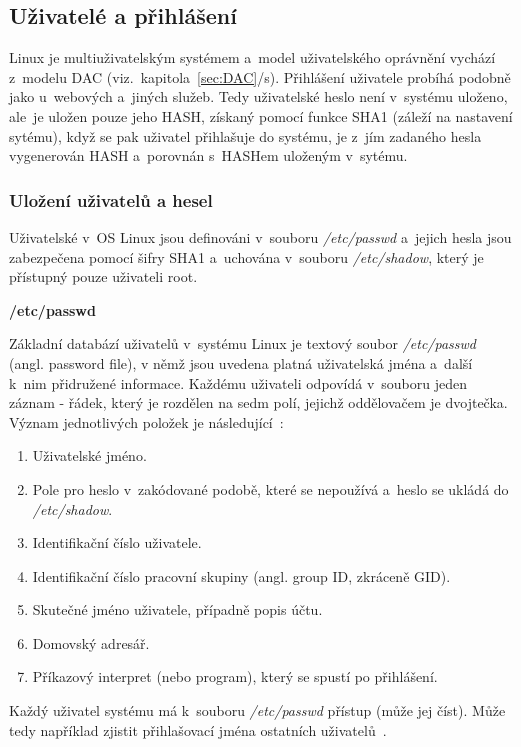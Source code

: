 \documentclass[a4paper,12pt]{article}
\newcommand{\odkazNaKapitolu}[1]{(viz.~kapitola~\ref{#1}/s\pageref{#1})}
\newcommand{\nadpis}[1]{%
	\vspace{4 mm}
	\textbf{#1}\\
	\vspace{4 mm}
	}
\begin{document}
\subsection{Uživatelé a přihlášení}

Linux je multiuživatelským systémem a~model uživatelského oprávnění vychází z~modelu DAC \odkazNaKapitolu{sec:DAC}. Přihlášení uživatele probíhá podobně jako u~webových a~jiných služeb. Tedy uživatelské heslo není v~systému uloženo, ale~je uložen pouze jeho HASH, získaný pomocí funkce SHA1 (záleží na nastavení sytému), když se pak uživatel přihlašuje do systému, je z~jím zadaného hesla vygenerován HASH a~porovnán s~HASHem uloženým v~sytému. 

\subsubsection{Uložení uživatelů a hesel}
Uživatelské v~OS Linux jsou definováni v~souboru \textit{/etc/passwd} a~jejich hesla jsou zabezpečena pomocí šifry SHA1 a~uchována v~souboru \textit{/etc/shadow}, který je přístupný pouze uživateli root. 

\nadpis{/etc/passwd}

Základní databází uživatelů v~systému Linux je textový soubor \textit{/etc/passwd} (angl. password file), v němž jsou uvedena platná uživatelská jména a~další k~nim přidružené informace. Každému uživateli odpovídá v~souboru jeden záznam - řádek, který je rozdělen na sedm polí, jejichž oddělovačem je dvojtečka. Význam jednotlivých položek je následující~\cite{LDP}:
\begin{enumerate}
 \item Uživatelské jméno.
 \item Pole pro heslo v~zakódované podobě, které se nepoužívá a~heslo se ukládá do \textit{/etc/shadow}.
 \item Identifikační číslo uživatele.
 \item Identifikační číslo pracovní skupiny (angl. group ID, zkráceně GID).
 \item Skutečné jméno uživatele, případně popis účtu.
 \item Domovský adresář.
 \item Příkazový interpret (nebo program), který se spustí po přihlášení.
\end{enumerate}

Každý uživatel systému má k~souboru \textit{/etc/passwd} přístup (může jej číst). Může tedy například zjistit přihlašovací jména ostatních uživatelů~\cite{LDP}.\\
\end{document}
